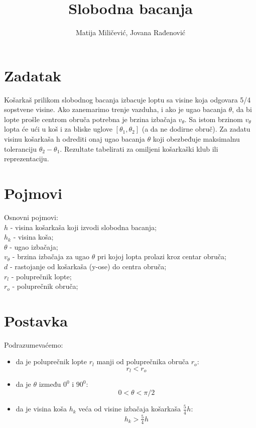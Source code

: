 \documentclass[a4paper, 12pt]{article}
\begin{document}
\title{Slobodna bacanja}

\author{Matija Miličević, Jovana Rađenović}

\maketitle

\section{Zadatak}

Košarkaš prilikom slobodnog bacanja izbacuje loptu sa visine koja odgovara 5/4 sopstvene visine. Ako zanemarimo trenje vazduha, i ako je ugao bacanja $\theta$, da bi lopte prošle centrom obruča potrebna je brzina izbačaja $v_\theta$. Sa istom brzinom $v_\theta$ lopta će ući u koš i za bliske uglove $[\theta_1, \theta_2]$ (a da ne dodirne obruč). Za zadatu visinu košarkaša h odrediti onaj ugao bacanja $\theta$ koji obezbeđuje maksimalnu toleranciju $\theta_2 - \theta_1$. Rezultate tabelirati za omiljeni košarkaški klub ili reprezentaciju.

\section{Pojmovi}

Osnovni pojmovi:\\
$h$ - visina košarkaša koji izvodi slobodna bacanja;\\
$h_k$ - visina koša;\\
$\theta$ - ugao izbačaja;\\
$v_\theta$ - brzina izbačaja za ugao $\theta$ pri kojoj lopta prolazi kroz centar obruča;\\
$d$ - rastojanje od košarkaša (y-ose) do centra obruča;\\
$r_l$ - poluprečnik lopte;\\
$r_o$ - poluprečnik obruča;\\


\pagebreak


\section{Postavka}

Podrazumevaćemo:
\begin{itemize}

\item da je poluprečnik lopte $r_l$ manji od poluprečnika obruča $r_o$:
\[r_l<r_o\] %

\item da je $\theta$ između $0^0$ i $90^0$:\\
\[0 < \theta < \pi/2\]

\item da je visina koša $h_k$ veća od visine izbačaja košarkaša $\dfrac{_5}{^4}h$:\\
\[h_k > \dfrac{_5}{^4}h\]  %

\end{itemize}
\end{document}
